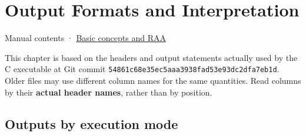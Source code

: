 \chapter{Output Formats and Interpretation}
\label{chap:05_output_formats}
Manual contents · \hyperref[chap:01_concepts_geometry]{Basic concepts and RAA}

This chapter is based on the headers and output statements actually used by the C executable at Git commit \texttt{54861c68e35ec5aa\allowbreak{}a3938fad53e93dc2\allowbreak{}dfa7eb1d}. Older files may use different column names for the same quantities. Read columns by their \textbf{actual header names}, rather than by position.

\section{Outputs by execution mode}
\label{sec:auto:05_output_formats:1}

